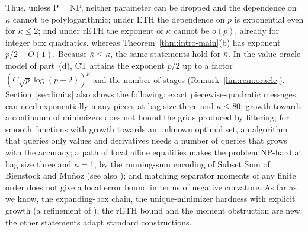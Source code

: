 Thus, unless P${}={}$NP, neither parameter can be dropped and the dependence
on $\kappa$ cannot be polylogarithmic; under ETH the dependence on $p$ is
exponential even for $\kappa\le2$; and under rETH the exponent of $\kappa$
cannot be $o(p)$, already for integer box quadratics, whereas
Theorem~\ref{thm:intro-main}(b) has exponent $p/2+O(1)$. Because
$\bar\kappa\le\kappa$, the same statements hold for $\bar\kappa$. In the
value-oracle model of part~(d), CT attains the exponent $p/2$ up to a factor
$(C\sqrt p\log(p+2))^p$ and the number of stages
(Remark~\ref{lim:rem:oracle}). Section~\ref{sec:limits} also shows the
following: exact piecewise-quadratic messages can need exponentially many
pieces at bag size three and $\kappa\le80$; growth towards a continuum of
minimizers does not bound the grids produced by filtering; for smooth
functions with growth towards an unknown optimal set, an algorithm that
queries only values and derivatives needs a number of queries that grows
with the accuracy; a path
of local affine equalities makes the problem NP-hard at bag size three and
$\kappa=1$, by the running-sum encoding of Subset Sum of Bienstock and
Mu\~noz \cite{BienstockMunoz2018} (see also
\cite[Example~1.1]{CifuentesParrilo2016}); and matching separator
moments of any finite order does not give a local error bound in terms of
negative curvature. As far as we know, the expanding-box chain, the
unique-minimizer hardness with explicit growth (a refinement of
\cite[Remark~2]{DelPiaKhajavirad2026}), the rETH bound and the moment
obstruction are new; the other statements adapt standard constructions.

